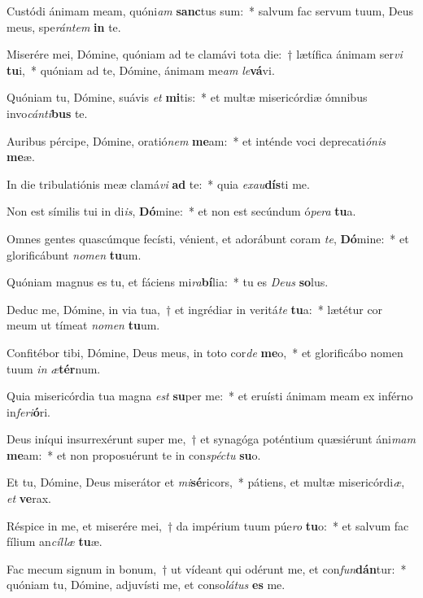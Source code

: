 \item Custódi ánimam meam, quóni\textit{am} \textbf{sanc}tus sum:~* salvum fac servum tuum, Deus meus, spe\textit{rán}\textit{tem} \textbf{in} te.
\item Miserére mei, Dómine, quóniam ad te clamávi tota die:~† lætífica ánimam ser\textit{vi} \textbf{tu}i,~* quóniam ad te, Dómine, ánimam me\textit{am} \textit{le}\textbf{vá}vi.
\item Quóniam tu, Dómine, suávis \textit{et} \textbf{mi}tis:~* et multæ misericórdiæ ómnibus invo\textit{cán}\textit{ti}\textbf{bus} te.
\item Auribus pércipe, Dómine, oratió\textit{nem} \textbf{me}am:~* et inténde voci deprecati\textit{ó}\textit{nis} \textbf{me}æ.
\item In die tribulatiónis meæ clamá\textit{vi} \textbf{ad} te:~* quia \textit{ex}\textit{au}\textbf{dís}ti me.
\item Non est símilis tui in di\textit{is}, \textbf{Dó}mine:~* et non est secúndum ó\textit{pe}\textit{ra} \textbf{tu}a.
\item Omnes gentes quascúmque fecísti, vénient, et adorábunt coram \textit{te}, \textbf{Dó}mine:~* et glorificábunt \textit{no}\textit{men} \textbf{tu}um.
\item Quóniam magnus es tu, et fáciens mi\textit{ra}\textbf{bí}lia:~* tu es \textit{De}\textit{us} \textbf{so}lus.
\item Deduc me, Dómine, in via tua,~† et ingrédiar in veritá\textit{te} \textbf{tu}a:~* lætétur cor meum ut tímeat \textit{no}\textit{men} \textbf{tu}um.
\item Confitébor tibi, Dómine, Deus meus, in toto cor\textit{de} \textbf{me}o,~* et glorificábo nomen tuum \textit{in} \textit{æ}\textbf{tér}num.
\item Quia misericórdia tua magna \textit{est} \textbf{su}per me:~* et eruísti ánimam meam ex inférno in\textit{fe}\textit{ri}\textbf{ó}ri.
\item Deus iníqui insurrexérunt super me,~† et synagóga poténtium quæsiérunt áni\textit{mam} \textbf{me}am:~* et non proposuérunt te in con\textit{spéc}\textit{tu} \textbf{su}o.
\item Et tu, Dómine, Deus miserátor et \textit{mi}\textbf{sé}ricors,~* pátiens, et multæ misericórdi\textit{æ}, \textit{et} \textbf{ve}rax.
\item Réspice in me, et miserére mei,~† da impérium tuum púe\textit{ro} \textbf{tu}o:~* et salvum fac fílium an\textit{cíl}\textit{læ} \textbf{tu}æ.
\item Fac mecum signum in bonum,~† ut vídeant qui odérunt me, et con\textit{fun}\textbf{dán}tur:~* quóniam tu, Dómine, adjuvísti me, et conso\textit{lá}\textit{tus} \textbf{es} me.
